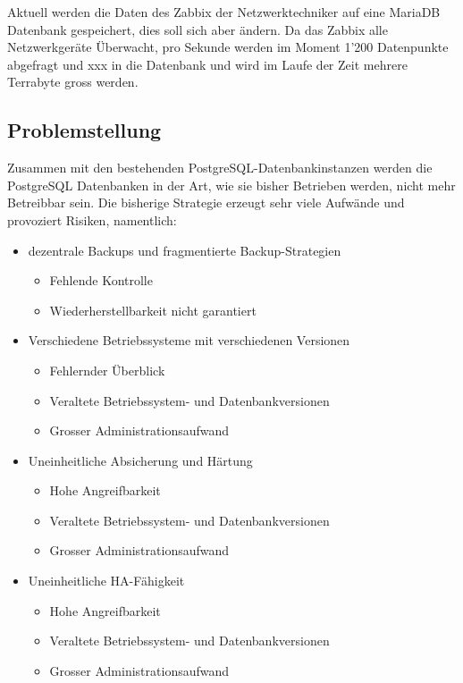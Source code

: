 \begin{flushleft}
    Aktuell werden die Daten des \Gls{Zabbix} der Netzwerktechniker auf eine \Gls{MariaDB} Datenbank gespeichert, dies soll sich aber ändern.
    Da das \Gls{Zabbix} alle Netzwerkgeräte Überwacht, pro Sekunde werden im Moment 1'200 Datenpunkte abgefragt und xxx in die Datenbank und wird im Laufe der Zeit mehrere Terrabyte gross werden.
\end{flushleft}
\begin{flushleft}
    \subsection{Problemstellung}
    Zusammen mit den bestehenden \Gls{PostgreSQL}-Datenbankinstanzen werden die \Gls{PostgreSQL} Datenbanken in der Art, wie sie bisher Betrieben werden, nicht mehr Betreibbar sein.
    Die bisherige Strategie erzeugt sehr viele Aufwände und provoziert Risiken, namentlich:
    \begin{itemize}
        \item dezentrale Backups und fragmentierte Backup-Strategien
        \begin{itemize}
            \item Fehlende Kontrolle
            \item Wiederherstellbarkeit nicht garantiert
        \end{itemize}
        \item Verschiedene Betriebssysteme mit verschiedenen Versionen
        \begin{itemize}
            \item Fehlernder Überblick
            \item Veraltete Betriebssystem- und Datenbankversionen
            \item Grosser Administrationsaufwand
        \end{itemize}
        \item Uneinheitliche Absicherung und Härtung
        \begin{itemize}
            \item Hohe Angreifbarkeit
            \item Veraltete Betriebssystem- und Datenbankversionen
            \item Grosser Administrationsaufwand
        \end{itemize}
        \item Uneinheitliche HA-Fähigkeit
        \begin{itemize}
            \item Hohe Angreifbarkeit
            \item Veraltete Betriebssystem- und Datenbankversionen
            \item Grosser Administrationsaufwand
        \end{itemize}
    \end{itemize}
\end{flushleft}
